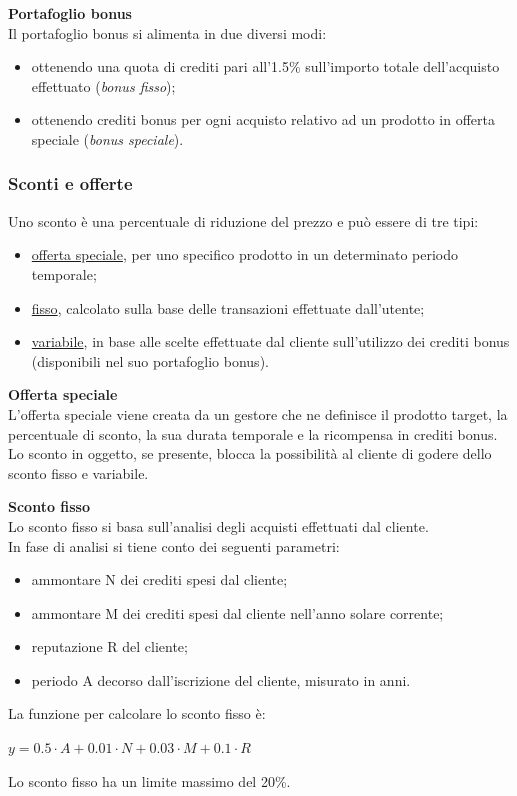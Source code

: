 \documentclass[a4paper, 14pt]{article}
\begin{document}
\begin{flushleft}
				\bigskip \textbf{Portafoglio bonus} \\ \smallskip \label{PortBonus}
				Il portafoglio bonus si alimenta in due diversi modi:
				\begin{itemize}
				\item ottenendo una quota di crediti pari all'1.5\% sull'importo totale dell'acquisto effettuato (\textit{bonus fisso});
				\item ottenendo crediti bonus per ogni acquisto relativo ad un prodotto in offerta speciale (\textit{bonus speciale}).
				\end{itemize}
			
			\subsubsection{Sconti e offerte} \label{Sconti}
				Uno sconto è una percentuale di riduzione del prezzo e può essere di tre tipi:
				\begin{itemize}
					\item \underline{offerta speciale}, per uno specifico prodotto in un determinato periodo temporale;
					\item \underline{fisso}, calcolato sulla base delle transazioni effettuate dall’utente;
					\item \underline{variabile}, in base alle scelte effettuate dal cliente sull’utilizzo dei crediti bonus (disponibili nel suo portafoglio bonus).
				\end{itemize}
			
				\bigskip \textbf{Offerta speciale} \\ \smallskip \label{OffSpec}
				L'offerta speciale viene creata da un gestore che ne definisce il prodotto target, la percentuale di sconto, la sua durata temporale e la ricompensa in crediti bonus.
				Lo sconto in oggetto, se presente, blocca la possibilità al cliente di godere dello sconto fisso e variabile.
				
				\bigskip \textbf{Sconto fisso} \\ \smallskip
				Lo sconto fisso si basa sull'analisi degli acquisti effettuati dal cliente. \\
				In fase di analisi si tiene conto dei seguenti parametri:
				\begin{itemize}
					\item ammontare N dei crediti spesi dal cliente;
					\item ammontare M dei crediti spesi dal cliente nell'anno solare corrente;
					\item reputazione R del cliente;
					\item periodo A decorso dall'iscrizione del cliente, misurato in anni.
				\end{itemize}
				La funzione per calcolare lo sconto fisso è:
				\begin{center}
					$ y = 0.5 \cdot A + 0.01 \cdot N + 0.03 \cdot M + 0.1 \cdot R $
				\end{center}
				Lo sconto fisso ha un limite massimo del 20\%.
				

\end{flushleft}
\end{document}
